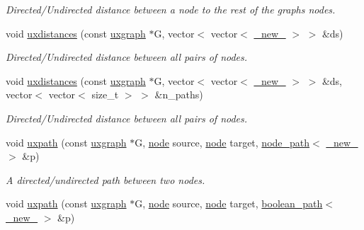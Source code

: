 \begin{DoxyCompactItemize}
\begin{DoxyCompactList}\small\item\em Directed/\+Undirected distance between a node to the rest of the graph\textquotesingle{}s nodes. \end{DoxyCompactList}\item 
void \hyperlink{namespacelgraph_1_1traversal_ab04202d9a05b39b38e5e8f35475b1665}{uxdistances} (const \hyperlink{classlgraph_1_1utils_1_1uxgraph}{uxgraph} $\ast$G, vector$<$ vector$<$ \hyperlink{namespacelgraph_1_1utils_a2c84bfde888c42ab3ad6b2cb8a364240}{\+\_\+new\+\_\+} $>$ $>$ \&ds)
\begin{DoxyCompactList}\small\item\em Directed/\+Undirected distance between all pairs of nodes. \end{DoxyCompactList}\item 
void \hyperlink{namespacelgraph_1_1traversal_a03137bf22fbff273ab60ec13db244ad5}{uxdistances} (const \hyperlink{classlgraph_1_1utils_1_1uxgraph}{uxgraph} $\ast$G, vector$<$ vector$<$ \hyperlink{namespacelgraph_1_1utils_a2c84bfde888c42ab3ad6b2cb8a364240}{\+\_\+new\+\_\+} $>$ $>$ \&ds, vector$<$ vector$<$ size\+\_\+t $>$ $>$ \&n\+\_\+paths)
\begin{DoxyCompactList}\small\item\em Directed/\+Undirected distance between all pairs of nodes. \end{DoxyCompactList}\item 
void \hyperlink{namespacelgraph_1_1traversal_a143fd991f5e035c64c94b2ac8d84b08c}{uxpath} (const \hyperlink{classlgraph_1_1utils_1_1uxgraph}{uxgraph} $\ast$G, \hyperlink{namespacelgraph_1_1utils_a7bd66ede3805ef121bc2835bd48de0cf}{node} source, \hyperlink{namespacelgraph_1_1utils_a7bd66ede3805ef121bc2835bd48de0cf}{node} target, \hyperlink{classlgraph_1_1utils_1_1node__path}{node\+\_\+path}$<$ \hyperlink{namespacelgraph_1_1utils_a2c84bfde888c42ab3ad6b2cb8a364240}{\+\_\+new\+\_\+} $>$ \&p)
\begin{DoxyCompactList}\small\item\em A directed/undirected path between two nodes. \end{DoxyCompactList}\item 
void \hyperlink{namespacelgraph_1_1traversal_a5873d9c87596daa9002ee537e1ac0252}{uxpath} (const \hyperlink{classlgraph_1_1utils_1_1uxgraph}{uxgraph} $\ast$G, \hyperlink{namespacelgraph_1_1utils_a7bd66ede3805ef121bc2835bd48de0cf}{node} source, \hyperlink{namespacelgraph_1_1utils_a7bd66ede3805ef121bc2835bd48de0cf}{node} target, \hyperlink{classlgraph_1_1utils_1_1boolean__path}{boolean\+\_\+path}$<$ \hyperlink{namespacelgraph_1_1utils_a2c84bfde888c42ab3ad6b2cb8a364240}{\+\_\+new\+\_\+} $>$ \&p)

\end{DoxyCompactItemize}
